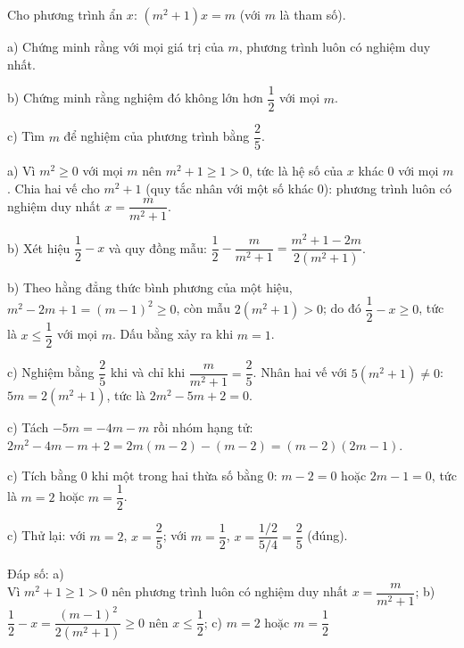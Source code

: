 \begin{problem}[8DS-PT1-049]
Cho phương trình ẩn $x$: $(m^2 + 1)x = m$ (với $m$ là tham số).

a) Chứng minh rằng với mọi giá trị của $m$, phương trình luôn có nghiệm duy nhất.

b) Chứng minh rằng nghiệm đó không lớn hơn $\dfrac{1}{2}$ với mọi $m$.

c) Tìm $m$ để nghiệm của phương trình bằng $\dfrac{2}{5}$.

\begin{solution}
a) Vì $m^2 \geq 0$ với mọi $m$ nên $m^2 + 1 \geq 1 > 0$, tức là hệ số của $x$ khác $0$ với mọi $m$. Chia hai vế cho $m^2 + 1$ (quy tắc nhân với một số khác $0$): phương trình luôn có nghiệm duy nhất $x = \dfrac{m}{m^2 + 1}$.

b) Xét hiệu $\dfrac{1}{2} - x$ và quy đồng mẫu: $\dfrac{1}{2} - \dfrac{m}{m^2 + 1} = \dfrac{m^2 + 1 - 2m}{2(m^2 + 1)}$.

b) Theo hằng đẳng thức bình phương của một hiệu, $m^2 - 2m + 1 = (m - 1)^2 \geq 0$, còn mẫu $2(m^2 + 1) > 0$; do đó $\dfrac{1}{2} - x \geq 0$, tức là $x \leq \dfrac{1}{2}$ với mọi $m$. Dấu bằng xảy ra khi $m = 1$.

c) Nghiệm bằng $\dfrac{2}{5}$ khi và chỉ khi $\dfrac{m}{m^2 + 1} = \dfrac{2}{5}$. Nhân hai vế với $5(m^2 + 1) \neq 0$: $5m = 2(m^2 + 1)$, tức là $2m^2 - 5m + 2 = 0$.

c) Tách $-5m = -4m - m$ rồi nhóm hạng tử: $2m^2 - 4m - m + 2 = 2m(m - 2) - (m - 2) = (m - 2)(2m - 1)$.

c) Tích bằng $0$ khi một trong hai thừa số bằng $0$: $m - 2 = 0$ hoặc $2m - 1 = 0$, tức là $m = 2$ hoặc $m = \dfrac{1}{2}$.

c) Thử lại: với $m = 2$, $x = \dfrac{2}{5}$; với $m = \dfrac{1}{2}$, $x = \dfrac{1/2}{5/4} = \dfrac{2}{5}$ (đúng).

Đáp số: a) $\boxed{\text{Vì } m^2 + 1 \geq 1 > 0 \text{ nên phương trình luôn có nghiệm duy nhất } x = \dfrac{m}{m^2 + 1}}$; b) $\boxed{\dfrac{1}{2} - x = \dfrac{(m - 1)^2}{2(m^2 + 1)} \geq 0 \text{ nên } x \leq \dfrac{1}{2}}$; c) $\boxed{m = 2 \text{ hoặc } m = \dfrac{1}{2}}$
\end{solution}
\end{problem}

